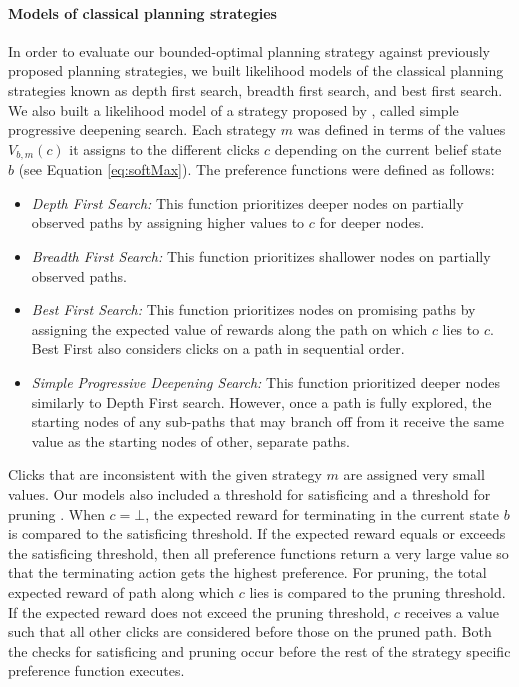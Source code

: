 \paragraph{Models of classical planning strategies}
In order to evaluate our bounded-optimal planning strategy against previously proposed planning strategies, we built likelihood models of the classical planning strategies known as depth first search, breadth first search, and best first search. We also built a likelihood model of a strategy proposed by \citet{NewellSimon1972a}, called simple progressive deepening search. Each strategy $m$ was defined in terms of the values $V_{b,m}(c)$ it assigns to the different clicks $c$ depending on the current belief state $b$ (see Equation \ref{eq:softMax}). The preference functions were defined as follows:
\begin{itemize}
    \item \textit{Depth First Search:} This function prioritizes deeper nodes on partially observed paths by assigning higher values to $c$ for deeper nodes. 
    \item \textit{Breadth First Search:} This function prioritizes shallower nodes on partially observed paths. 
    \item \textit{Best First Search:} This function prioritizes nodes on promising paths by assigning the expected value of rewards along the path on which $c$ lies to $c$. Best First also considers clicks on a path in sequential order. 
    \item \textit{Simple Progressive Deepening Search:} This function prioritized deeper nodes similarly to Depth First search. However, once a path is fully explored, the starting nodes of any sub-paths that may branch off from it receive the same value as the starting nodes of other, separate paths.
\end{itemize}
Clicks that are inconsistent with the given strategy $m$ are assigned very small values. Our models also included a threshold for satisficing \citep{Simon1956} and a threshold for pruning \citep{Huys2012}. When $c = \bot$, the expected reward for terminating in the current state $b$ is compared to the satisficing threshold. If the expected reward equals or exceeds the satisficing threshold, then all preference functions return a very large value so that the terminating action gets the highest preference. For pruning, the total expected reward of path along which $c$ lies is compared to the pruning threshold. If the expected reward does not exceed the pruning threshold, $c$ receives a value such that all other clicks are considered before those on the pruned path. Both the checks for satisficing and pruning occur before the rest of the strategy specific preference function executes.



